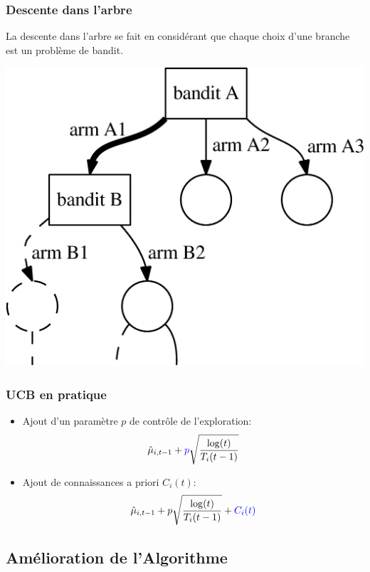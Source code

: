 \documentclass[compress, color = usenames, dvipsnames]{beamer}
\begin{document}
\begin{frame}
    \frametitle{Descente dans l'arbre}
    La descente dans l'arbre se fait en considérant que chaque choix d'une branche est un problème de bandit.

    \begin{center}
        \includegraphics[scale=0.5]{figs/bandit_cascade.png}
    \end{center}


\end{frame}

\begin{frame}
    \frametitle{UCB en pratique}
    \begin{itemize}
        \item Ajout d'un paramètre $p$ de contrôle de l'exploration:
            $$ \hat{\mu}_{i,t-1} + {\color{blue}p} \sqrt{\frac{\log(t)}{T_i(t-1)}} $$
        \item Ajout de connaissances a priori $C_i(t)$:
            $$ \hat{\mu}_{i,t-1} + p \sqrt{\frac{\log(t)}{T_i(t-1)}} + {\color{blue} C_i(t)} $$
    \end{itemize}
    
\end{frame}


\subsection{Amélioration de l'Algorithme}

\end{document}
